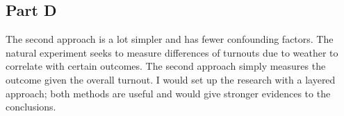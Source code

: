 \documentclass[../ass.tex]{subfiles}
\begin{document}
\subsection{Part D}
The second approach is a lot simpler and has fewer confounding factors. 
The natural experiment seeks to measure differences of turnouts due to weather to correlate with certain outcomes.
The second approach simply measures the outcome given the overall turnout. 
I would set up the research with a layered approach; both methods are useful and would give stronger evidences to the conclusions. 
\end{document}
